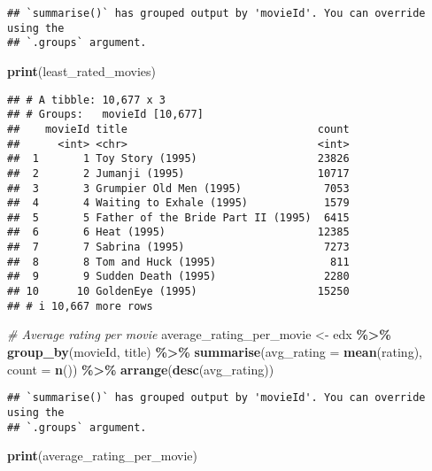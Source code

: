 \documentclass[
]{article}
\newenvironment{Shaded}{\begin{snugshade}}{\end{snugshade}}
\newcommand{\AttributeTok}[1]{\textcolor[rgb]{0.13,0.29,0.53}{#1}}
\newcommand{\CommentTok}[1]{\textcolor[rgb]{0.56,0.35,0.01}{\textit{#1}}}
\newcommand{\FunctionTok}[1]{\textcolor[rgb]{0.13,0.29,0.53}{\textbf{#1}}}
\newcommand{\NormalTok}[1]{#1}
\newcommand{\OtherTok}[1]{\textcolor[rgb]{0.56,0.35,0.01}{#1}}
\newcommand{\SpecialCharTok}[1]{\textcolor[rgb]{0.81,0.36,0.00}{\textbf{#1}}}
\begin{document}
\begin{verbatim}
## `summarise()` has grouped output by 'movieId'. You can override using the
## `.groups` argument.
\end{verbatim}

\begin{Shaded}
\begin{Highlighting}[]
\FunctionTok{print}\NormalTok{(least\_rated\_movies)}
\end{Highlighting}
\end{Shaded}

\begin{verbatim}
## # A tibble: 10,677 x 3
## # Groups:   movieId [10,677]
##    movieId title                              count
##      <int> <chr>                              <int>
##  1       1 Toy Story (1995)                   23826
##  2       2 Jumanji (1995)                     10717
##  3       3 Grumpier Old Men (1995)             7053
##  4       4 Waiting to Exhale (1995)            1579
##  5       5 Father of the Bride Part II (1995)  6415
##  6       6 Heat (1995)                        12385
##  7       7 Sabrina (1995)                      7273
##  8       8 Tom and Huck (1995)                  811
##  9       9 Sudden Death (1995)                 2280
## 10      10 GoldenEye (1995)                   15250
## # i 10,667 more rows
\end{verbatim}

\begin{Shaded}
\begin{Highlighting}[]
\CommentTok{\# Average rating per movie}
\NormalTok{average\_rating\_per\_movie }\OtherTok{\textless{}{-}}\NormalTok{ edx }\SpecialCharTok{\%\textgreater{}\%}
  \FunctionTok{group\_by}\NormalTok{(movieId, title) }\SpecialCharTok{\%\textgreater{}\%}
  \FunctionTok{summarise}\NormalTok{(}\AttributeTok{avg\_rating =} \FunctionTok{mean}\NormalTok{(rating), }\AttributeTok{count =} \FunctionTok{n}\NormalTok{()) }\SpecialCharTok{\%\textgreater{}\%}
  \FunctionTok{arrange}\NormalTok{(}\FunctionTok{desc}\NormalTok{(avg\_rating))}
\end{Highlighting}
\end{Shaded}

\begin{verbatim}
## `summarise()` has grouped output by 'movieId'. You can override using the
## `.groups` argument.
\end{verbatim}

\begin{Shaded}
\begin{Highlighting}[]
\FunctionTok{print}\NormalTok{(average\_rating\_per\_movie)}
\end{Highlighting}
\end{Shaded}
\end{document}
